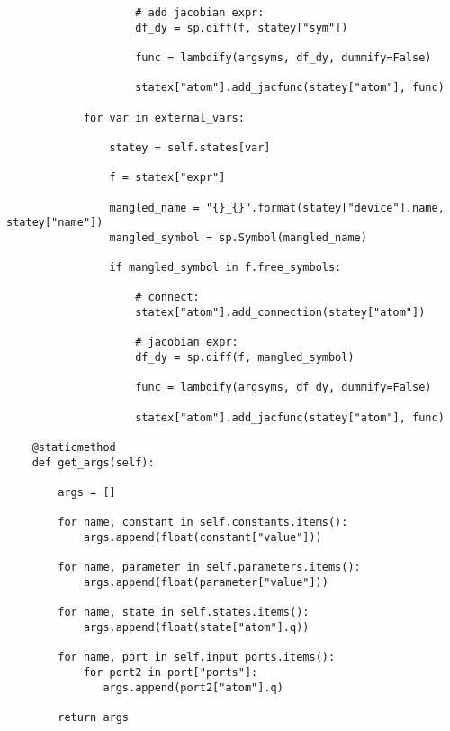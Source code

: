 \begin{lstlisting}
                    # add jacobian expr:
                    df_dy = sp.diff(f, statey["sym"])

                    func = lambdify(argsyms, df_dy, dummify=False)

                    statex["atom"].add_jacfunc(statey["atom"], func)

            for var in external_vars:

                statey = self.states[var]

                f = statex["expr"]

                mangled_name = "{}_{}".format(statey["device"].name, statey["name"])
                mangled_symbol = sp.Symbol(mangled_name)

                if mangled_symbol in f.free_symbols:

                    # connect:
                    statex["atom"].add_connection(statey["atom"])

                    # jacobian expr:
                    df_dy = sp.diff(f, mangled_symbol)

                    func = lambdify(argsyms, df_dy, dummify=False)

                    statex["atom"].add_jacfunc(statey["atom"], func)

    @staticmethod
    def get_args(self):

        args = []

        for name, constant in self.constants.items():
            args.append(float(constant["value"]))

        for name, parameter in self.parameters.items():
            args.append(float(parameter["value"]))

        for name, state in self.states.items():
            args.append(float(state["atom"].q))

        for name, port in self.input_ports.items():
            for port2 in port["ports"]:
               args.append(port2["atom"].q)

        return args

\end{lstlisting}